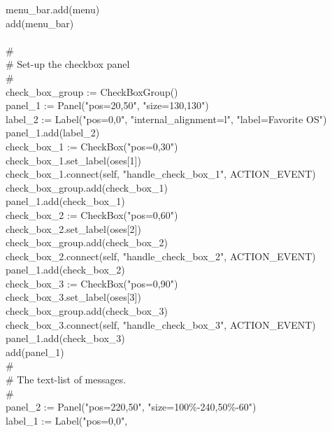 {\>   \ \ \ menu\_bar.add(menu) \\
\>   \ \ \ add(menu\_bar) \\
\ \\
\>   \ \ \ \# \\
\>   \ \ \ \# Set-up the checkbox panel \\
\>   \ \ \ \# \\
\>   \ \ \ check\_box\_group := CheckBoxGroup() \\
\>   \ \ \ panel\_1 := Panel("pos=20,50",
"size=130,130") \\
\>   \ \ \ label\_2 := Label("pos=0,0",
"internal\_alignment=l",
"label=Favorite OS") \\
\>   \ \ \ panel\_1.add(label\_2) \\
\>   \ \ \ check\_box\_1 :=
CheckBox("pos=0,30") \\
\>   \ \ \ check\_box\_1.set\_label(oses[1]) \\
\>   \ \ \ check\_box\_1.connect(self,
"handle\_check\_box\_1", ACTION\_EVENT) \\
\>   \ \ \ check\_box\_group.add(check\_box\_1) \\
\>   \ \ \ panel\_1.add(check\_box\_1) \\
\>   \ \ \ check\_box\_2 :=
CheckBox("pos=0,60") \\
\>   \ \ \ check\_box\_2.set\_label(oses[2]) \\
\>   \ \ \ check\_box\_group.add(check\_box\_2) \\
\>   \ \ \ check\_box\_2.connect(self,
"handle\_check\_box\_2", ACTION\_EVENT) \\
\>   \ \ \ panel\_1.add(check\_box\_2) \\
\>   \ \ \ check\_box\_3 :=
CheckBox("pos=0,90") \\
\>   \ \ \ check\_box\_3.set\_label(oses[3]) \\
\>   \ \ \ check\_box\_group.add(check\_box\_3) \\
\>   \ \ \ check\_box\_3.connect(self,
"handle\_check\_box\_3", ACTION\_EVENT) \\
\>   \ \ \ panel\_1.add(check\_box\_3) \\
\>   \ \ \ add(panel\_1) \\
\>   \ \ \ \# \\
\>   \ \ \ \# The text-list of messages. \\
\>   \ \ \ \# \\
\>   \ \ \ panel\_2 := Panel("pos=220,50",
"size=100\%-240,50\%-60") \\
\>   \ \ \ label\_1 := Label("pos=0,0",
}
